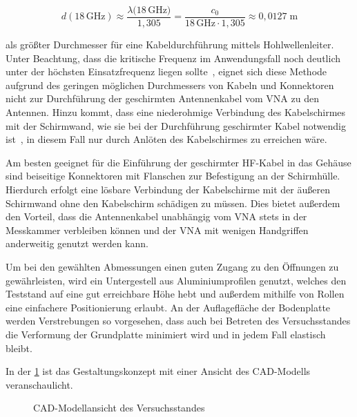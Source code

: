 \begin{equation}
    d(18\,\si{\giga\hertz}) \approx \frac{\lambda(18\,\si{\giga\hertz)}}{1,305} = \frac{c_0}{18\,\si{\giga\hertz}\cdot 1,305} \approx 0,0127 \; \si{\meter}
\end{equation}

als größter Durchmesser für eine Kabeldurchführung mittels Hohlwellenleiter. Unter Beachtung, dass die kritische Frequenz im Anwendungsfall noch deutlich unter der höchsten Einsatzfrequenz liegen sollte~\cite{EM_Schirmung}, eignet sich diese Methode aufgrund des geringen möglichen Durchmessers von Kabeln und Konnektoren nicht zur Durchführung der geschirmten Antennenkabel vom \ac{VNA} zu den Antennen. Hinzu kommt, dass eine niederohmige Verbindung des Kabelschirmes mit der Schirmwand, wie sie bei der Durchführung geschirmter Kabel notwendig ist~\cite{EM_Schirmung, EMV}, in diesem Fall nur durch Anlöten des Kabelschirmes zu erreichen wäre.
\par
\vspace{\linespace}
Am besten geeignet für die Einführung der geschirmter HF-Kabel in das Gehäuse sind beiseitige Konnektoren mit Flanschen zur Befestigung an der Schirmhülle. Hierdurch erfolgt eine lösbare Verbindung der Kabelschirme mit der äußeren Schirmwand ohne den Kabelschirm schädigen zu müssen. Dies bietet außerdem den Vorteil, dass die Antennenkabel unabhängig vom \ac{VNA} stets in der Messkammer verbleiben können und der \ac{VNA} mit wenigen Handgriffen anderweitig genutzt werden kann. 
\par
\vspace{\linespace}
Um bei den gewählten Abmessungen einen guten Zugang zu den Öffnungen zu gewährleisten, wird ein Untergestell aus Aluminiumprofilen genutzt, welches den Teststand auf eine gut erreichbare Höhe hebt und außerdem mithilfe von Rollen eine einfachere Positionierung erlaubt. An der Auflagefläche der Bodenplatte werden Verstrebungen so vorgesehen, dass auch bei Betreten des Versuchsstandes die Verformung der Grundplatte minimiert wird und in jedem Fall elastisch bleibt.
\par
\vspace{\linespace}
In der \Abb\ref{fig:3_Entwurf_CAD} ist das Gestaltungskonzept mit einer Ansicht des CAD-Modells veranschaulicht. 


\begin{figure}
    \centering
    \caption{CAD-Modellansicht des Versuchsstandes}
    \label{fig:3_Entwurf_CAD}
\end{figure}
















